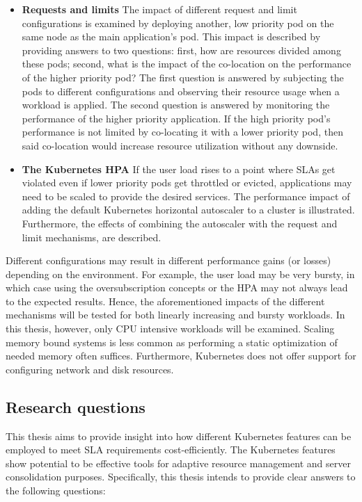 \begin{itemize}
    \item \textbf{Requests and limits}
    The impact of different request and limit configurations is examined by deploying another, low priority pod on the same node as the main application's pod. This impact is described by providing answers to two questions: first, how are resources divided among these pods; second, what is the impact of the co-location on the performance of the higher priority pod? The first question is answered by subjecting the pods to different configurations and observing their resource usage when a workload is applied. The second question is answered by monitoring the performance of the higher priority application. If the high priority pod's performance is not limited by co-locating it with a lower priority pod, then said co-location would increase resource utilization without any downside.
    \item \textbf{The Kubernetes HPA}
    If the user load rises to a point where SLAs get violated even if lower priority pods get throttled or evicted, applications may need to be scaled to provide the desired services. The performance impact of adding the default Kubernetes horizontal autoscaler to a cluster is illustrated. Furthermore, the effects of combining the autoscaler with the request and limit mechanisms, are described.
\end{itemize}

Different configurations may result in different performance gains (or losses) depending on the environment. For example, the user load may be very bursty, in which case using the oversubscription concepts or the HPA may not always lead to the expected results. Hence, the aforementioned impacts of the different mechanisms will be tested for both linearly increasing and bursty workloads. In this thesis, however, only CPU intensive workloads will be examined. Scaling memory bound systems is less common as performing a static optimization of needed memory often suffices. Furthermore, Kubernetes does not offer support for configuring network and disk resources.

\subsection{Research questions}
This thesis aims to provide insight into how different Kubernetes features can be employed to meet SLA requirements cost-efficiently. The Kubernetes features show potential to be effective tools for adaptive resource management and server consolidation purposes. Specifically, this thesis intends to provide clear answers to the following questions:

